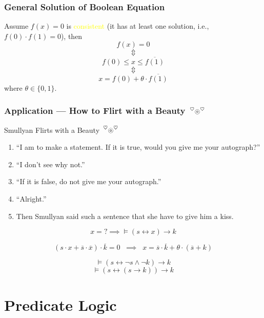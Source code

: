 \documentclass[UTF8,aspectratio=43,11pt,colorlinks,compress,openany]{beamer}%
\begin{document}
\begin{frame}\frametitle{General Solution of Boolean Equation}
	\begin{theorem}
		Assume $f(x)=0$ is \textcolor{yellow}{consistent} (it has at least one solution, i.e., $f(0)\cdot f(1)=0$), then
		\[f(x)=0\]
		\[\Updownarrow\]
		\[f(0)\leq x\leq\overline{f(1)}\]
		\[\Updownarrow\]
		\[x=f(0)+\theta\cdot\overline{f(1)}\]
		where $\theta\in\{0,1\}$.
	\end{theorem}
\end{frame}

\begin{frame}\frametitle{Application --- How to Flirt with a Beauty $\sideset{^\heartsuit}{^\heartsuit}{\operatorname{\circledcirc}}$}
	\begin{block}{Smullyan Flirts with a Beauty $\sideset{^\heartsuit}{^\heartsuit}{\operatorname{\circledcirc}}$}
	\begin{enumerate}\small
		\item ``I am to make a statement. If it is true, would you give me your autograph?''
		\item ``I don't see why not.''
		\item ``If it is false, do not give me your autograph.''
		\item ``Alright.''
		\item Then Smullyan said such a sentence that she have to give him a kiss.
	\end{enumerate}
	\end{block}
\[x=?\implies\vDash(s\leftrightarrow x)\to k\]
	\pause
	\begin{solution}\vspace*{-1ex}
		\[\left(s\cdot x+\overline{s}\cdot\overline{x}\right)\cdot\overline{k}=0\;\;\implies \;\; x=\overline{s}\cdot\overline{k}+\theta\cdot(\overline{s}+k)\]
	\end{solution}\vspace{-2ex}
	\[\vDash(s\leftrightarrow\neg s\wedge\neg k)\to k\]
	\[\vDash(s\leftrightarrow(s\to k))\to k\]
\end{frame}


\section{Predicate Logic}
\end{document}
